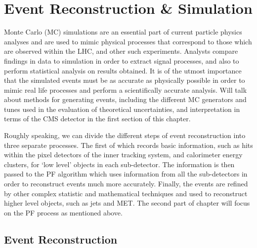 \chapter{Event Reconstruction \& Simulation} \label{chap-EventReconstruction&Simulation}

Monte Carlo (MC) simulations are an essential part of current particle physics analyses and are used to mimic physical processes that correspond to those which are observed within the LHC, and other such experiments. Analysts compare findings in data to simulation in order to extract signal processes, and also to perform statistical analysis on results obtained. It is of the utmost importance that the simulated events must be as accurate as physically possible in order to mimic real life processes and perform a scientifically accurate analysis. Will talk about methods for generating events, including the different MC generators and tunes used in the evaluation of theoretical uncertainties, and interpretation in terms of the CMS detector in the first section of this chapter.

Roughly speaking, we can divide the different steps of event reconstruction into three separate processes. The first of which records basic information, such as hits within the pixel detectors of the inner tracking system, and calorimeter energy clusters, for `low level' objects in each sub-detector. The information is then passed to the PF algorithm which uses information from all the sub-detectors in order to reconstruct events much more accurately. Finally, the events are refined by other complex statistic and mathematical techniques and used to reconstruct higher level objects, such as jets and MET. The second part of chapter will focus on the PF process \cite{CMS-PAS-PFT-09-001, CMS-PAS-PFT-10-001} as mentioned above.

\section{Event Reconstruction} \label{sec-EventReconstruction}

